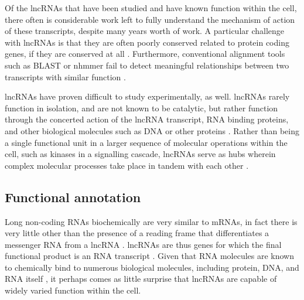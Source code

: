 Of the lncRNAs that have been studied and have known function within the cell, there often is considerable work left to fully understand the mechanism of action of these transcripts, despite many years worth of work. A particular challenge with lncRNAs is that they are often poorly conserved related to protein coding genes, if they are conserved at all \cite{Sleutels2002TheGenes,Pang2006RapidFunction, Johnsson2014EvolutionaryFunction}. Furthermore, conventional alignment tools such as BLAST or nhmmer fail to detect meaningful relationships between two transcripts with similar function \cite{Kirk2018FunctionalContent,Sprague2019NonlinearDomains}. 

lncRNAs have proven difficult to study experimentally, as well. lncRNAs rarely function in isolation, and are not known to be catalytic, but rather function through the concerted action of the lncRNA transcript, RNA binding proteins, and other biological molecules such as DNA or other proteins \cite{Chu2015SystematicProteins,Schertzer2019LncRNA-InducedDNA,Hacisuleyman2016FunctionLocus,Wang2011AExpression,Yang2013MALAT-1Regulation}. Rather than being a single functional unit in a larger sequence of molecular operations within the cell, such as kinases in a signalling cascade, lncRNAs serve as hubs wherein complex molecular processes take place in tandem with each other \cite{Schertzer2019LncRNA-InducedDNA, Chu2015SystematicProteins, Moindrot2015ASilencing,Brockdorff2018LocalNcRNA}. 



\subsection{Functional annotation}
Long non-coding RNAs biochemically are very similar to mRNAs, in fact there is very little other than the presence of a reading frame that differentiates a messenger RNA from a lncRNA \cite{Amaral2008TheMachine}. lncRNAs are thus genes for which the final functional product is an RNA transcript \cite{Ponting2009EvolutionRNAs}. Given that RNA molecules are known to chemically bind to numerous biological molecules, including protein, DNA, and RNA itself \cite{Chu2015SystematicProteins,Hacisuleyman2016FunctionLocus,Schertzer2019LncRNA-InducedDNA}, it perhaps comes as little surprise that lncRNAs are capable of widely varied function within the cell. 

